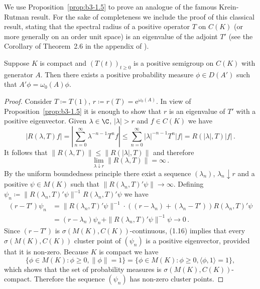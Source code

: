 We use Proposition~\ref{prop:b3-1.5} to prove an analogue of the famous Krein-Rutman result.
For the sake of completeness we include the proof of this classical result, stating that the spectral radius of a positive operator $T$ on $C(K)$ (or more generally on an order unit space) is an eigenvalue of the adjoint $T'$ (see the Corollary of Theorem~2.6 in the appendix of \citet{schaefer:1966}).
\begin{theorem}\label{thm:b3-1.6}
	Suppose $K$ is compact and $(T(t))_{t \geq 0}$ is a positive semigroup on $C(K)$ with generator $A$.
	Then there exists a positive probability measure $\phi \in D(A')$ such that $A'\phi = \omega_{0}(A)\phi$.
\end{theorem}
\begin{proof}
	Consider $T \coloneqq T(1)$, $r \coloneqq r(T) = \mathrm{e}^{\omega_{0}(A)}$.
	In view of Proposition~\ref{prop:b3-1.5} it is enough to show that $r$ is an eigenvalue of $T'$ with a positive eigenvector.
	Given $\lambda \in \C$, $|\lambda| > r$ and $f \in C(K)$ we have
	\[
	|R(\lambda,T)f| = \left|\sum_{n=0}^{\infty} \lambda^{-n-1} T^{n}f\right| \leq \sum_{n=0}^{\infty} |\lambda|^{-n-1} T^{n}|f| = R(|\lambda|,T) |f|\,.
	\]
	It follows that $\|R(\lambda,T)\| \leq \|R(|\lambda|,T)\|$ and therefore
	\begin{equation}\label{eq:b3-1.15}
		\lim_{\lambda \downarrow r}\|R(\lambda,T)\| = \infty\,.
	\end{equation}
	By the uniform boundedness principle there exist a sequence $(\lambda_{n})$, $\lambda_{n} \downarrow r$ and a positive $\psi \in M(K)$ such that $\|R(\lambda_{n},T)'\psi\| \to \infty$.
	Defining $\psi_{n} \coloneqq \|R(\lambda_{n},T)'\psi\|^{-1}R(\lambda_{n},T)'\psi$ we have
%
%		
	\begin{equation}\label{eq:b3-1.16}
		\begin{split}
		(r - T')\psi_{n} & = \|R(\lambda_{n},T)'\psi\|^{-1}\cdot((r-\lambda_{n}) + (\lambda_{n} - T'))R(\lambda_{n},T)'\psi\\ 
		& = (r-\lambda_{n})\psi_{n} + \|R(\lambda_{n},T)'\psi\|^{-1}\psi \to 0\,.
		\end{split}
	\end{equation}
	Since $(r - T')$ is $\sigma(M(K),C(K))$-continuous, (1.16) implies that every $\sigma(M(K),C(K))$ cluster point of $(\psi_{n})$ is a positive eigenvector, provided that it is non-zero.
	Because $K$ is compact we have 
%
\[
	\{\phi \in M(K) \colon \phi \geq 0, \|\phi\| = 1\} 
	= \{\phi \in M(K) \colon \phi \geq 0, \langle \phi,1 \rangle = 1\} , 
\]
which shows that the set of probability measures is $\sigma(M(K),C(K))$-compact.
	Therefore the sequence $(\psi_{n})$ has non-zero cluster points.
\end{proof}
